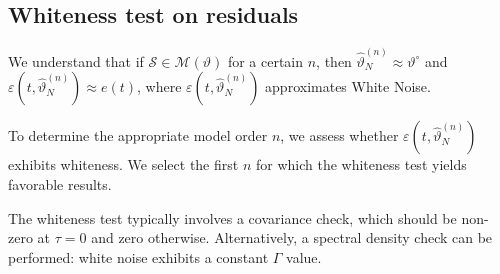\subsection{Whiteness test on residuals}
We understand that if $\mathcal{S} \in \mathcal{M}(\vartheta)$ for a certain $n$, then $\hat{\vartheta}_N^{(n)} \approx \vartheta^\circ$ and $\varepsilon(t,\hat{\vartheta}_N^{(n)})\approx e(t)$, where $\varepsilon(t,\hat{\vartheta}_N^{(n)})$ approximates White Noise.

To determine the appropriate model order $n$, we assess whether $\varepsilon(t,\hat{\vartheta}_N^{(n)})$ exhibits whiteness. 
We select the first $n$ for which the whiteness test yields favorable results.

The whiteness test typically involves a covariance check, which should be non-zero at $\tau=0$ and zero otherwise. 
Alternatively, a spectral density check can be performed: white noise exhibits a constant $\Gamma$ value.

